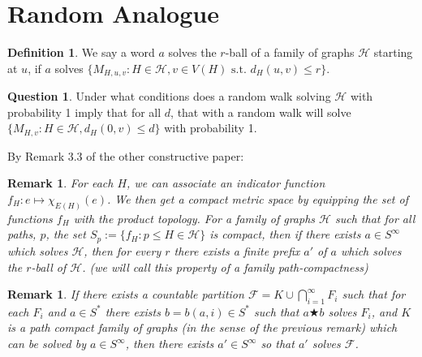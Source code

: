 \documentclass[a4paper]{article}
\newtheorem{rmk}[result]{Remark}
\theoremstyle{definition}
\newtheorem*{defn}{Definition}
\newtheorem*{que}{Question}
\begin{document}
\section{Random Analogue}

\begin{defn}
    We say a word $a$ solves the $r$-ball of a family of graphs $\mathcal{H}$ starting at $u$, if $a$ solves $\{M_{H,u,v}: H\in \mathcal{H}, v\in V(H) \textrm{ s.t. } d_H(u,v)\le r\}$. 
\end{defn}

\begin{que}
    Under what conditions does a random walk solving $\mathcal{H}$ with probability 1 imply that for all $d$, that with a random walk will solve $\{M_{H,v}: H\in\mathcal{H},d_H(0,v) \le d\}$ with probability 1.
\end{que}
By Remark 3.3 of the other constructive paper:
\begin{rmk}
    For each $H$, we can associate an indicator function $f_H:e\mapsto \chi_{E(H)}(e)$. We then get a compact metric space by equipping the set of functions $f_H$ with the product topology. For a family of graphs $\mathcal{H}$ such that for all paths, $p$, the set $S_p:=\{f_H:p\le H \in \mathcal{H}\}$ is compact, then if there exists $a \in S^\infty$ which solves $\mathcal{H}$, then for every $r$ there exists a finite prefix $a'$ of $a$ which solves the $r$-ball of $\mathcal{H}$. (we will call this property of a family path-compactness)
\end{rmk}

\begin{rmk} If there exists a countable partition $\mathcal{F} = K \cup \bigcap_{i=1}^\infty F_i$ such that for each $F_i$ and $a \in S^*$ there exists $b= b(a,i) \in S^*$ such that $a\bigstar b$ solves $F_i$, and $K$ is a path compact family of graphs (in the sense of the previous remark) which can be solved by $a \in S^\infty$, then there exists $a' \in S^\infty$ so that $a'$ solves $\mathcal{F}$.
\end{rmk}

\section{}
\end{document}
